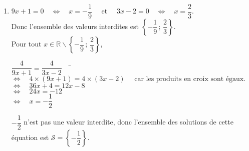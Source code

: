 \documentclass[a4paper,11pt,exos]{nsi} %
\begin{document}
\begin{enumerate}
    \item $9x+1=0 \quad\iff\quad x=-\dfrac{1}{9} \quad$ et $\quad 3x-2=0 \quad\iff\quad x=\dfrac{2}{3}$. \\
          Donc l'ensemble des valeurs interdites est  $\left\{-\dfrac{1}{9}\,;\,\dfrac{2}{3}\right\}$. \\Pour tout $x\in \mathbb{R}\smallsetminus\left\{-\dfrac{1}{9}\,;\,\dfrac{2}{3}\right\}$,
    \begin{tabbing}
        $\dfrac{4}{9x+1}=\dfrac{4}{3x-2} \quad$ \=  $\iff \quad 4\times (9x+1)=4\times (3x-2)\quad \text{ car les produits en croix sont égaux.}$\\
        \>  $\iff\quad  36x+4=12x-8$\\
        \>  $\iff\quad  24x= -12$\\
        \>  $\iff\quad  x=-\dfrac{1}{2}$
    \end{tabbing}
    $-\dfrac{1}{2}$ n'est pas une valeur interdite, donc l'ensemble des solutions de cette équation est  $\mathcal{S}=\left\{-\dfrac{1}{2}\right\}$.
\end{enumerate}
\end{document}
